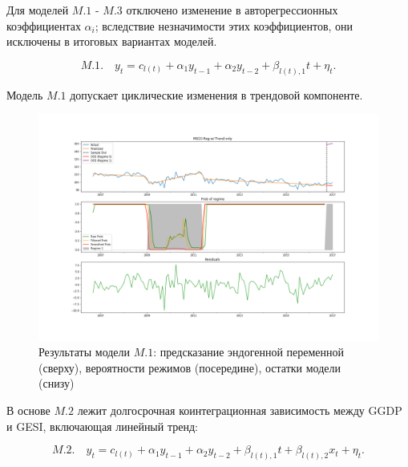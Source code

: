 \documentclass[a4paper,14pt]{extreport}
\begin{document}
Для моделей $M.1$ - $M.3$ отключено изменение в авторегрессионных коэффициентах $\alpha_i$; вследствие незначимости этих коэффициентов, они исключены в итоговых вариантах моделей.


\begin{equation}	
	M.1. \quad y_t = c_{l(t)} + \alpha_1 y_{t-1} + \alpha_2 y_{t-2} + \beta_{l(t), 1} t + \eta_t .
\end{equation}

Модель $M.1$ допускает циклические изменения в трендовой компоненте. 

\begin{figure}[H]
	\includegraphics[width=\linewidth]{img/manual/model_m1.png}
	\caption{Результаты модели $M.1$: предсказание эндогенной переменной (сверху), вероятности режимов (посередине), остатки модели (снизу)}
	\label{fig:sm_model_m1}
\end{figure}

В основе $M.2$ лежит долгосрочная коинтеграционная зависимость между GGDP и GESI, включающая линейный тренд:

\begin{equation}
	M.2. \quad y_t = c_{l(t)} + \alpha_1 y_{t-1} + \alpha_2 y_{t-2} + \beta_{l(t), 1} t + \beta_{l(t), 2} x_{t} + \eta_t .
\end{equation}
\end{document}
